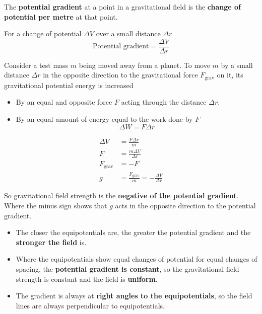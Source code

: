 The \textbf{potential gradient} at a point in a gravitational field is the \textbf{change of potential per metre} at that point.

For a change of potential $\Delta V$ over a small distance $\Delta r$
$$\text{Potential gradient}=\frac{\Delta V}{\Delta r}$$

Consider a test mass $m$ being moved away from a planet. To move $m$ by a small distance $\Delta r$ in the opposite direction to the gravitational force $F_\text{grav}$ on it, its gravitational potential energy is increased
\begin{itemize}
    \item By an equal and opposite force $F$ acting through the distance $\Delta r$.
    \item By an equal amount of energy equal to the work done by $F$
        $$\Delta W=F\Delta r$$
\end{itemize}
\begin{align*}
    \Delta V&=\frac{F\Delta r}{m}\\
    F&=\frac{m\Delta V}{\Delta r}\\
    F_\text{grav}&=-F\\
    g&=\frac{F_\text{grav}}{m}=-\frac{\Delta V}{\Delta r}
\end{align*}

So gravitational field strength is the \textbf{negative of the potential gradient}. Where the minus sign shows that $g$ acts in the opposite direction to the potential gradient.
\begin{itemize}
    \item The closer the equipotentials are, the greater the potential gradient and the \textbf{stronger the field} is.
    \item Where the equipotentials show equal changes of potential for equal changes of spacing, the \textbf{potential gradient is constant}, so the gravitational field strength is constant and the field is \textbf{uniform}.
    \item The gradient is always at \textbf{right angles to the equipotentials}, so the field lines are always perpendicular to equipotentials.
\end{itemize}
